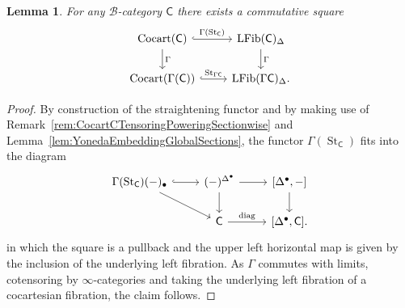 \documentclass[reqno]{amsart}
\numberwithin{equation}{subsection}
\theoremstyle{plain}
\newtheorem{lemma}[equation]{Lemma}
\theoremstyle{definition}
\let\scr=\mathcal
\def\BB{\scr B}
\DeclareMathOperator{\Cocart}{Cocart}
\DeclareMathOperator{\LFib}{LFib}
\DeclareMathOperator{\diag}{diag}
\DeclareMathOperator{\St}{St}
\newcommand{\I}[1]{\mathsf{#1}}
\newcommand{\iFun}[2]{{[#1,#2]}}
\newcommand{\Simp}[1]{#1_{\Delta}}
\begin{document}
\begin{lemma}
	\label{lem:comparisonStraighteningInternalExternal}
	For any $\BB$-category $\I{C}$ there exists a commutative square
	\begin{equation*}
	\begin{tikzcd}
		\Cocart(\I{C})\arrow[r, hookrightarrow, "\Gamma(\St_{\I{C}})"] \arrow[d, "\Gamma"]& \Simp{\LFib(\I{C})}\arrow[d, "\Gamma"]\\
		\Cocart(\Gamma(\I{C}))\arrow[r, hookrightarrow, "\St_{\Gamma\I{C}}"] & \Simp{\LFib(\Gamma\I{C})}.
	\end{tikzcd}
	\end{equation*}
\end{lemma}
\begin{proof}
	By construction of the straightening functor and by making use of Remark~\ref{rem:CocartCTensoringPoweringSectionwise} and Lemma~\ref{lem:YonedaEmbeddingGlobalSections}, the functor $\Gamma(\St_{\I{C}})$ fits into the diagram
	\begin{equation*}
	\begin{tikzcd}
	\Gamma(\St_{\I{C}})(-)_\bullet\arrow[r, hookrightarrow]\arrow[dr] & (-)^{\Delta^{\bullet}}\arrow[d] \arrow[r] & \iFun{\Delta^{\bullet}}{-}\arrow[d]\\
	&\I{C}\arrow[r, "\diag"] & \iFun{\Delta^{\bullet}}{\I{C}}.
	\end{tikzcd}
	\end{equation*}
	in which the square is a pullback and the upper left horizontal map is given by the inclusion of the underlying left fibration. As $\Gamma$ commutes with limits, cotensoring by $\infty$-categories and taking the underlying left fibration of a cocartesian fibration, the claim follows.
\end{proof}
\end{document}
